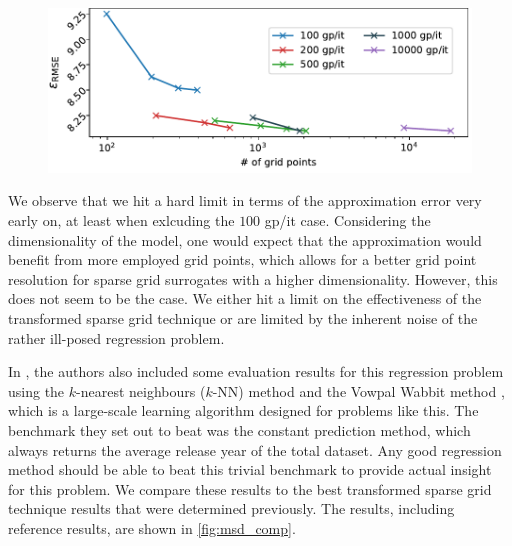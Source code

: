 \documentclass[
  a4paper,  %
  twoside,  %
  bibliography=totoc,
  headsepline,
  cleardoublepage=empty,
  parskip=half,
  draft=false
]{scrbook}
\begin{document}
\begin{mdframed}[style=style]
\begin{figure}[H]
\includegraphics[width=\textwidth]{graphics/msd_errors}
\delimit
{}
\label{fig:msd_approx}
\end{figure}
\end{mdframed}
%
We observe that we hit a hard limit in terms of the approximation error very early on, at least when exlcuding the $100$ gp/it case.
Considering the dimensionality of the model, one would expect that the approximation would benefit from more employed grid points, which allows for a better grid point resolution for sparse grid surrogates with a higher dimensionality.
However, this does not seem to be the case.
We either hit a limit on the effectiveness of the transformed sparse grid technique or are limited by the inherent noise of the rather ill-posed regression problem.

In \cite{BertinMahieux2011}, the authors also included some evaluation results for this regression problem using the $k$-nearest neighbours ($k$-NN) method \cite{Altman1992} and the Vowpal Wabbit method \cite{Langford2009}, which is a large-scale learning algorithm designed for problems like this.
The benchmark they set out to beat was the constant prediction method, which always returns the average release year of the total dataset.
Any good regression method should be able to beat this trivial benchmark to provide actual insight for this problem.
We compare these results to the best transformed sparse grid technique results that were determined previously.
The results, including reference results, are shown in \cref{fig:msd_comp}.
\end{document}
